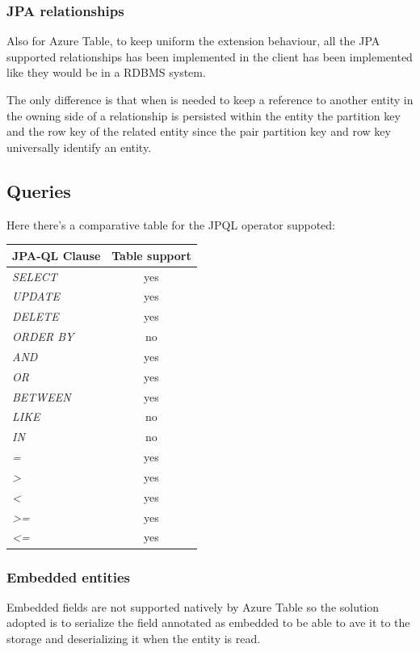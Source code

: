 \subsubsection{JPA relationships}
Also for Azure Table, to keep uniform the extension behaviour, all the JPA supported relationships has been implemented in the client has been implemented like they would be in a RDBMS system.

The only difference is that when is needed to keep a reference to another entity in the owning side of a relationship is persisted within the entity the partition key and the row key of the related entity since the pair partition key and row key universally identify an entity.

\subsection{Queries}
Here there's a comparative table for the JPQL operator suppoted:
\begin{table}[h]
\begin{tabular}{|l|c|}
\hline
\textbf{JPA-QL Clause} & \textbf{Table support} \\ \hline\hline
\textit{SELECT}        & yes \\ \hline
\textit{UPDATE}        & yes \\ \hline
\textit{DELETE}        & yes \\ \hline
\textit{ORDER BY}      & no \\ \hline
\textit{AND}           & yes \\ \hline
\textit{OR}            & yes \\ \hline
\textit{BETWEEN}       & yes \\ \hline
\textit{LIKE}          & no  \\ \hline
\textit{IN}            & no  \\ \hline
\textit{=}             & yes \\ \hline
\textit{\textgreater}  & yes \\ \hline
\textit{\textless}     & yes \\ \hline
\textit{\textgreater=} & yes \\ \hline
\textit{\textless=}    & yes \\ \hline
\end{tabular}
\end{table}

\subsubsection{Embedded entities}
Embedded fields are not supported natively by Azure Table so the solution adopted is to serialize the field annotated as embedded to be able to ave it to the storage and deserializing it when the entity is read.

